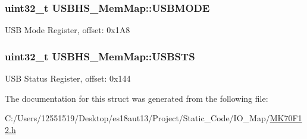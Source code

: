 \subsubsection[{U\+S\+B\+M\+O\+D\+E}]{\setlength{\rightskip}{0pt plus 5cm}uint32\+\_\+t U\+S\+B\+H\+S\+\_\+\+Mem\+Map\+::\+U\+S\+B\+M\+O\+D\+E}\label{struct_u_s_b_h_s___mem_map_afe4ec3963906653c83890dea008fac84}
U\+S\+B Mode Register, offset\+: 0x1\+A8 \hypertarget{struct_u_s_b_h_s___mem_map_ab651a6e6b81d8e4f97a9637833cc45b2}{}
\subsubsection[{U\+S\+B\+S\+T\+S}]{\setlength{\rightskip}{0pt plus 5cm}uint32\+\_\+t U\+S\+B\+H\+S\+\_\+\+Mem\+Map\+::\+U\+S\+B\+S\+T\+S}\label{struct_u_s_b_h_s___mem_map_ab651a6e6b81d8e4f97a9637833cc45b2}
U\+S\+B Status Register, offset\+: 0x144 

The documentation for this struct was generated from the following file\+:\begin{DoxyCompactItemize}
\item 
C\+:/\+Users/12551519/\+Desktop/es18aut13/\+Project/\+Static\+\_\+\+Code/\+I\+O\+\_\+\+Map/\hyperlink{_m_k70_f12_8h}{M\+K70\+F12.\+h}\end{DoxyCompactItemize}
